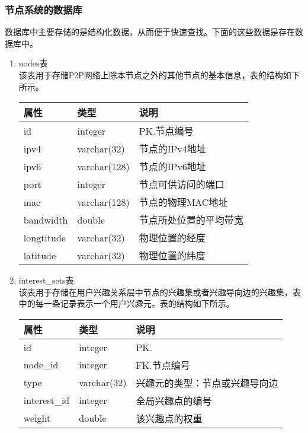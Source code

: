 \subsubsection{节点系统的数据库}
数据库中主要存储的是结构化数据，从而便于快速查找。下面的这些数据是存在数据库中。
\begin{enumerate}
\item nodes表 \\
该表用于存储P2P网络上除本节点之外的其他节点的基本信息，表的结构如下所示。
\begin{table}[!htb]
  \centering
  \begin{tabular}{|l|l|l|}
    \hline
    属性 & 类型 & 说明 \\
    \hline
    id & integer & PK.节点编号 \\
    \hline
    ipv4 & varchar(32) & 节点的IPv4地址 \\
    \hline
    ipv6 & varchar(128) & 节点的IPv6地址 \\
    \hline
    port & integer & 节点可供访问的端口 \\
    \hline
    mac & varchar(128) & 节点的物理MAC地址\\
    \hline
    bandwidth & double & 节点所处位置的平均带宽 \\
    \hline
    longtitude & varchar(32) & 物理位置的经度 \\
    \hline
    latitude & varchar(32) & 物理位置的纬度 \\
    \hline
  \end{tabular}
\end{table}
\item interest\_sets表 \\
该表用于存储在用户兴趣关系层中节点的兴趣集或者兴趣导向边的兴趣集，表中的每一条记录表示一个用户兴趣元。表的结构如下所示。
\begin{table}[!htb]
  \centering
  \begin{tabular}{|l|l|l|}
    \hline
    属性 & 类型 & 说明 \\
    \hline
    id & integer & PK. \\
    \hline
    node\_id & integer & FK.节点编号 \\
    \hline
    type & varchar(32) & 兴趣元的类型：节点或兴趣导向边 \\
    \hline
    interest\_id & integer & 全局兴趣点的编号 \\
    \hline
    weight & double & 该兴趣点的权重 \\
    \hline
  \end{tabular}
\end{table}

\end{enumerate}
